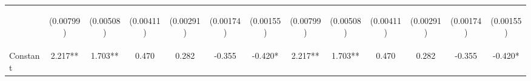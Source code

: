 \documentclass[]{article}
\begin{document}
\begin{center}
\begin{tabular}{lcccccccccccc}
\vspace{4pt} & \begin{footnotesize}(0.00799)\end{footnotesize} & \begin{footnotesize}(0.00508)\end{footnotesize} & \begin{footnotesize}(0.00411)\end{footnotesize} & \begin{footnotesize}(0.00291)\end{footnotesize} & \begin{footnotesize}(0.00174)\end{footnotesize} & \begin{footnotesize}(0.00155)\end{footnotesize} & \begin{footnotesize}(0.00799)\end{footnotesize} & \begin{footnotesize}(0.00508)\end{footnotesize} & \begin{footnotesize}(0.00411)\end{footnotesize} & \begin{footnotesize}(0.00291)\end{footnotesize} & \begin{footnotesize}(0.00174)\end{footnotesize} & \begin{footnotesize}(0.00155)\end{footnotesize} \\
Constant & 2.217** & 1.703** & 0.470 & 0.282 & -0.355 & -0.420* & 2.217** & 1.703** & 0.470 & 0.282 & -0.355 & -0.420* \\

\end{tabular}
\end{center}
\end{document}
